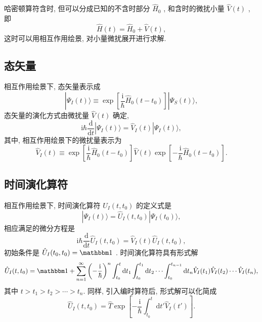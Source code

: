 哈密顿算符含时, 但可以分成已知的不含时部分 $\hat H_0$ , 和含时的微扰小量 $\hat V(t)$ , 即
\begin{equation}
   \hat H(t)=\hat H_0+\hat V(t), 
\end{equation}
这时可以用相互作用绘景, 对小量微扰展开进行求解. 

\subsection{ 态矢量}

相互作用绘景下, 态矢量表示成
\begin{equation}
   |\Psi_I(t)\rangle\equiv \exp\left[ \frac{\mathrm i}{\hbar}\hat H_0(t-t_0) \right]|\Psi_S(t)\rangle, 
\end{equation}
态矢量的演化方式由微扰量 $\hat V(t)$ 确定, 
\begin{equation}
   \mathrm i\hbar\frac{\mathrm d}{\mathrm dt}|\Psi_I(t)\rangle=\hat V_I(t)|\Psi_I(t)\rangle, 
\end{equation}
其中, 相互作用绘景下的微扰量表示为
\begin{equation}
   \hat V_I(t)\equiv\exp\left[ \frac{\mathrm i}{\hbar}\hat H_0(t-t_0) \right]\hat V(t)\exp\left[ -\frac{\mathrm i}{\hbar}\hat H_0(t-t_0) \right]. 
\end{equation}

\subsection{ 时间演化算符}

相互作用绘景下, 时间演化算符 $\hat U_I(t, t_0)$ 的定义式是
\begin{equation}
   |\Psi_I(t)\rangle=\hat U_I(t, t_0)|\Psi_I(t_0)\rangle, 
\end{equation}
相应满足的微分方程是
\begin{equation}
   \mathrm i\hbar\frac{\mathrm d}{\mathrm dt}\hat U_I(t, t_0)=\hat V_I(t)\hat U_I(t, t_0), 
\end{equation}
初始条件是 $\hat U_I(t_0, t_0)=\mathbbm 1$ . 时间演化算符具有形式解
\begin{equation}
   \hat U_I(t, t_0)=\mathbbm 1+\sum_{n=1}^\infty \left( -\frac{\mathrm i}{\hbar} \right)^n\int_{t_0}^t\mathrm dt_1\int_{t_0}^{t_1}\mathrm dt_2\cdots\int_{t_0}^{t_{n-1}}\mathrm dt_n\hat V_I(t_1)\hat V_I(t_2)\cdots\hat V_I(t_n), 
\end{equation}
其中 $t>t_1>t_2>\cdots >t_n$. 同样, 引入编时算符后, 形式解可以化简成
\begin{equation}
   \hat U_I(t, t_0)=\hat T\exp\left[ -\frac{\mathrm i}{\hbar}\int_{t_0}^t \mathrm dt'\hat V_I(t') \right]. 
\end{equation}

